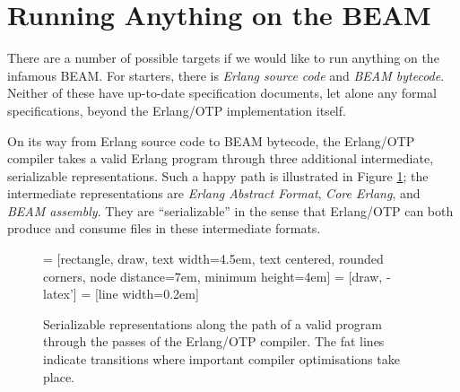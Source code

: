 \section{Running Anything on the BEAM}

There are a number of possible targets if we would like to run
anything on the infamous BEAM. For starters, there is \emph{Erlang
source code} and \emph{BEAM bytecode}. Neither of these have
up-to-date specification documents\footnotemark, let alone any formal
specifications, beyond the Erlang/OTP implementation itself.


On its way from Erlang source code to BEAM bytecode, the Erlang/OTP
compiler takes a valid Erlang program through three additional
intermediate, serializable representations. Such a happy path is
illustrated in Figure \ref{fig:serializable-representations}; the
intermediate representations are \emph{Erlang Abstract Format},
\emph{Core Erlang}, and \emph{BEAM assembly}.  They are
``serializable'' in the sense that Erlang/OTP can both produce and
consume files in these intermediate formats.
 
\begin{figure}[h]
\centering
{} = [rectangle, draw, 
    text width=4.5em, text centered, rounded corners,
    node distance=7em,
    minimum height=4em]
 = [draw, -latex']
 = [line width=0.2em]


\caption{Serializable representations along the path of a valid
program through the passes of the Erlang/OTP compiler. The fat lines
indicate transitions where important compiler optimisations take
place.}

\label{fig:serializable-representations}
\end{figure}

